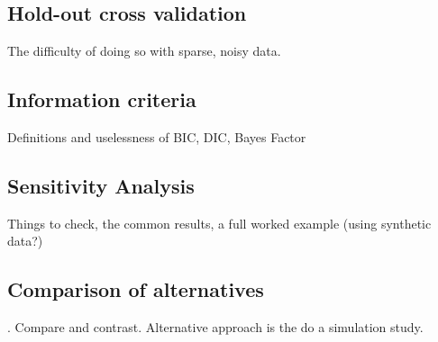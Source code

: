 \subsection{Hold-out cross validation}
The difficulty of doing so with sparse, noisy data.

\subsection{Information criteria}
Definitions and uselessness of BIC, DIC, Bayes Factor

\subsection{Sensitivity Analysis}
Things to check, the common results, a full worked example (using synthetic data?)

\subsection{Comparison of alternatives}
.
Compare and contrast.  Alternative approach is the do a simulation study.
